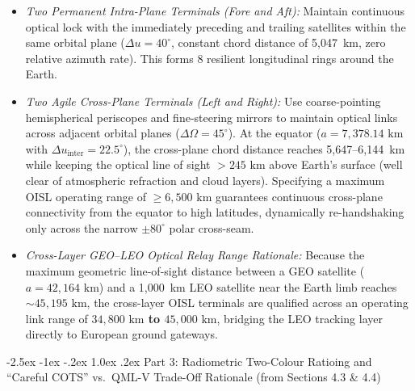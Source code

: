 \documentclass[11pt,a4paper]{article}
\makeatletter
\renewcommand\subsection{\@startsection{subsection}{2}{\z@}%
    {-2.5ex \@plus -1ex \@minus -.2ex}%
    {1.0ex \@plus .2ex}%
    {\normalfont\large\bfseries\sffamily\color{SubHeadingBlue}}}
\providecommand{\abbr}[1]{#1}
\makeatother
\begin{document}
\begin{itemize}
    \item \emph{Two Permanent Intra-Plane Terminals (Fore and Aft):} Maintain continuous optical lock with the immediately preceding and trailing satellites within the same orbital plane ($\Delta u = 40^\circ$, constant chord distance of 5,047~km, zero relative azimuth rate). This forms 8 resilient longitudinal rings around the Earth.
    \item \emph{Two Agile Cross-Plane Terminals (Left and Right):} Use coarse-pointing hemispherical periscopes and fine-steering mirrors to maintain optical links across adjacent orbital planes ($\Delta\Omega = 45^\circ$). At the equator ($a = 7{,}378.14\text{ km}$ with $\Delta u_{\text{inter}} = 22.5^\circ$), the cross-plane chord distance reaches 5,647--6,144~km while keeping the optical line of sight $> 245\text{ km}$ above Earth's surface (well clear of atmospheric refraction and cloud layers). Specifying a maximum \abbr{OISL} operating range of $\ge 6{,}500\text{ km}$ guarantees continuous cross-plane connectivity from the equator to high latitudes, dynamically re-handshaking only across the narrow $\pm 80^\circ$ polar cross-seam.
    \item \emph{Cross-Layer \abbr{GEO}--\abbr{LEO} Optical Relay Range Rationale:} Because the maximum geometric line-of-sight distance between a \abbr{GEO} satellite ($a = 42{,}164\text{ km}$) and a 1,000~km \abbr{LEO} satellite near the Earth limb reaches $\sim 45{,}195\text{ km}$, the cross-layer \abbr{OISL} terminals are qualified across an operating link range of \textbf{$34{,}800\text{ km}$ to $45{,}000\text{ km}$}, bridging the \abbr{LEO} tracking layer directly to European ground gateways.
\end{itemize}

\subsection{Part 3: Radiometric Two-Colour Ratioing and ``Careful COTS'' vs.\ QML-V Trade-Off Rationale (from Sections 4.3 \& 4.4)}
\end{document}
